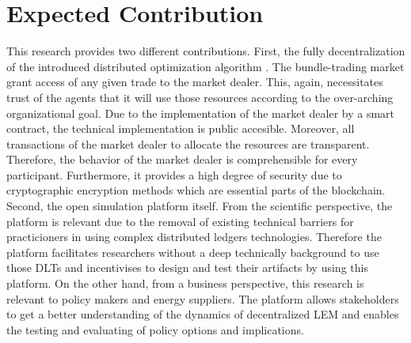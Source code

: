 \section{Expected Contribution}
\label{sec:expected_contribution}

This research provides two different contributions. First, the fully decentralization of the introduced distributed optimization algorithm . 
The bundle-trading market grant access of any given trade to the market dealer. This, again, necessitates trust of the agents that it will use those resources according to the over-arching organizational goal. Due to the implementation of the market dealer by a smart contract, the technical implementation is public accesible. Moreover, all transactions of the market dealer to allocate the resources are transparent. Therefore, the behavior of the market dealer is comprehensible for every participant. Furthermore, it provides a high degree of security due to cryptographic encryption methods which are essential parts of the blockchain.
Second, the open simulation platform itself. From the scientific perspective, the platform is relevant due to the removal of existing technical barriers for practicioners in using complex distributed ledgers technologies. Therefore the platform facilitates researchers without a deep technically background to use those DLTs and incentivises to design and test their artifacts by using this platform. 
On the other hand, from a business perspective, this research is relevant to policy makers and energy suppliers. The platform allows stakeholders to get a better understanding of the dynamics of decentralized LEM and enables the testing and evaluating of policy options and implications. 

\clearpage